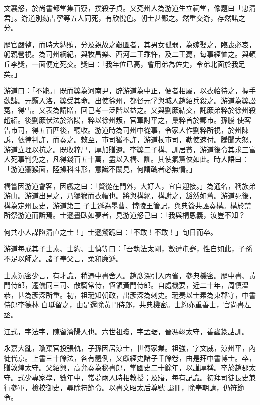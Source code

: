\begin{pinyinscope}
 文襄怒，於尚書都堂集百寮，撲殺子貞。又兗州人為游道生立祠堂，像題曰「忠清君」。游道別劾吉寧等五人同死，有欣悅色。朝士甚鄙之。然重交游，存然諾之
 分。



 歷官嚴整，而時大納賄，分及親故之艱匱者，其男女孤弱，為嫁娶之，臨喪必哀，躬親營視。為司州綱紀，與牧昌樂、西河二王乖忤，及二王薨，每事經恤之。與頓丘李獎，一面便定死交。獎曰：「我年位已高，會用弟為佐史，令弟北面於我足矣。」



 游道曰：「不能。」既而獎為河南尹，辟游道為中正，便者相屬，以衣帢待之，握手歡謔。元顥入洛，獎受其命。出使徐州，都督元孚與城人趙紹兵殺之。游道為獎訟冤，得雪。又表為請贈，回己考一泛階以益之。又與劉廞結交，託廞弟粹於徐州殺趙紹。後劉廞伏法於洛陽，粹以徐州叛，官軍討平之，梟粹首於鄴市。孫騰
 使客告市司，得五百匹後，聽收。游道時為司州中從事，令家人作劉粹所視，於州陳訴，依律判許，而奏之。敕至，市司猶不許，游道杖市司，勒使速付。騰聞大怒，游道立理以抗之。既收粹尸，厚加贈遺。李獎二子構、訓居貧，游道後令其求三富人死事判免之，凡得錢百五十萬，盡以入構、訓。其使氣黨俠如此。時人語曰：「游道獼猴面，陸操科斗形，意識不關見，何謂醜者必無情。」



 構嘗因游道會客，因戲之曰：「賢從在門外，大好人，宜自迎接。」為通名，稱族弟游山。游道出見之，乃獼猴而衣帽也。將與構絕，構謝之，豁然如舊。游道死後，構為定州長史，游道第三
 子士遜為墨曹、博陵王管記，與典簽共誣奏構。構於禁所祭游道而訴焉。士遜晝臥如夢者，見游道怒己曰：「我與構恩義，汝豈不知？



 何共小人謀陷清直之士！」士遜驚跪曰：「不敢！不敢！」旬日而卒。



 游道每戒其子士素、士約、士慎等曰：「吾執法太剛，數遭屯蹇，性自如此，子孫不足以師之。諸子奉父言，柔和廉遜。



 士素沉密少言，有才識，稍遷中書舍人。趙彥深引入內省，參典機密。歷中書、黃門侍郎，遷儀同三司、散騎常侍，恆領黃門侍郎。自處機要，近二十年，周慎溫恭，甚為彥深所重。初，祖珽知朝政，出彥深為刺史。珽奏以士素為東郡守，中書侍郎李德林
 白珽留之，由是還除黃門侍郎，共典機密。士約亦重善士，官尚書左丞。



 江式，字法字，陳留濟陽人也。六世祖瓊，字孟琚，晉馮翊太守，善蟲篆詁訓。



 永嘉大亂，瓊棄官投張軌，子孫因居涼士，世傳家業。祖強，字文威，涼州平，內徙代京。上書三十餘法，各有體例，又獻經史諸子千餘卷，由是拜中書博士。卒，贈敦煌太守。父紹興，高允奏為秘書郎，掌國史二十餘年，以謹厚稱。卒於趙郡太守。式少專家學，數年中，常夢兩人時相教授；及寤，每有記識。初拜司徒長史兼行參軍，檢校御史，尋除符節令。以書文昭太后尊號
 謚冊，除奉朝請，仍符節令。




\end{pinyinscope}
